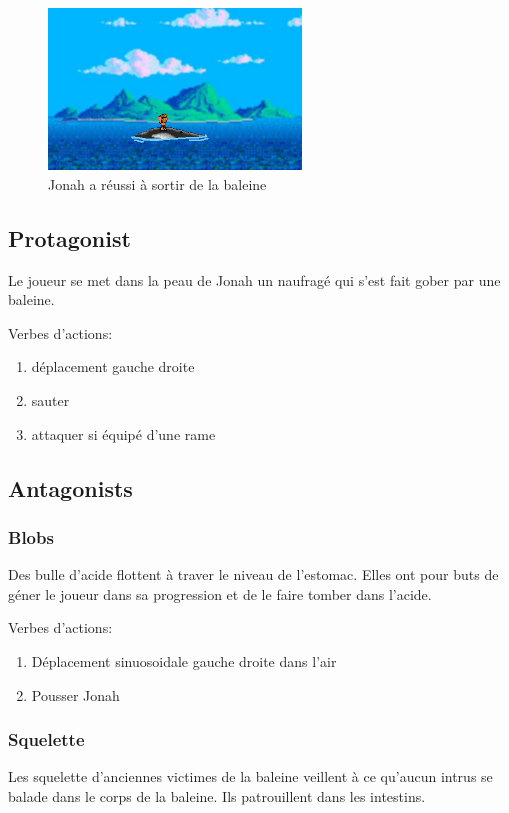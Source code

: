 \documentclass{prologArticle}
\begin{document}
\begin{figure}[H]
    \centering
    \includegraphics[width=0.6\textwidth]{res/story3.png}
    \caption{Jonah a réussi à sortir de la baleine}
\end{figure}

\subsection{Protagonist}

Le joueur se met dans la peau de Jonah un naufragé qui s'est fait gober par une baleine.

Verbes d'actions:
\begin{enumerate}
    \item déplacement gauche droite
    \item sauter
    \item attaquer si équipé d'une rame
\end{enumerate}

\subsection{Antagonists}

\subsubsection{Blobs}
Des bulle d'acide flottent à traver le niveau de l'estomac. Elles ont pour buts de géner le joueur dans sa progression et de le faire tomber dans l'acide.

Verbes d'actions:
\begin{enumerate}
    \item Déplacement sinuosoidale gauche droite dans l'air
    \item Pousser Jonah
\end{enumerate}

\subsubsection{Squelette}
Les squelette d'anciennes victimes de la baleine veillent à ce qu'aucun intrus se balade dans le corps de la baleine. Ils patrouillent dans les intestins.
\end{document}
